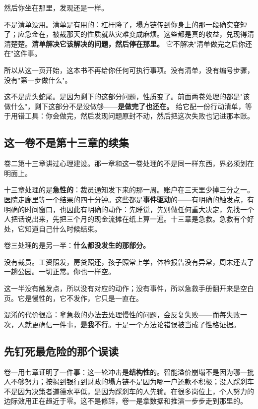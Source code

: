\documentclass[11pt,a4paper]{ctexart}
\begin{document}
然后你坐在那里，发现还是一样。

不是清单没用。清单是有用的：杠杆降了，塌方链传到你身上的那一段确实变短了；应急金在，被裁那天的性质就从灾难变成麻烦。这些都是真的收益，兑现得清清楚楚。\textbf{清单解决它该解决的问题，然后停在那里。} 它不解决"清单做完之后你还在"这件事。

所以从这一页开始，这本书不再给你任何可执行事项。没有清单，没有编号步骤，没有"第一步做什么"。

这不是虎头蛇尾。是因为剩下的这部分问题，性质变了。前面两卷处理的都是"该做什么"，剩下这部分不是没做够——\textbf{是做完了也还在。} 给它配一份行动清单，等于用错工具：你会做完，然后发现问题原封不动，然后把这次失败也记进那本账。

\subsection{这一卷不是第十三章的续集}

卷二第十三章讲过心理建设。那一章和这一卷处理的不是同一样东西，界必须划在明面上。

十三章处理的是\textbf{急性的}：裁员通知发下来的那一周。账户在三天里少掉三分之一。医院走廊里等一个结果的四十分钟。这些都是\textbf{事件驱动}的——有明确的触发点，有明确的时间窗口，也因此有明确的动作：先睡觉，先别做任何重大决定，先找一个人把话说出来，先把三个月的现金流摊在纸上算一遍。十三章是急救。急救有个好处，它知道自己什么时候结束。

卷三处理的是另一半：\textbf{什么都没发生的那部分。}

没有裁员。工资照发，房贷照还，孩子照常上学，体检报告没有异常，周末还去了一趟公园。一切正常。你也一样空。

这一半没有触发点，所以没有对应的动作；没有事件，所以急救手册翻开来是空白页。它是慢性的，它不发作，它只是一直在。

混淆的代价很高：拿急救的办法去处理慢性的问题，会反复失败——而每失败一次，人就更确信一件事，\textbf{是我不行}。于是一个方法论错误被当成了性格证据。

\subsection{先钉死最危险的那个误读}

卷一用七章证明了一件事：这一轮冲击是\textbf{结构性}的。智能溢价崩塌不是因为哪一批人不够努力；按揭到银行到财政的塌方链不是因为哪一户还款不积极；没人踩刹车不是因为决策者道德水平低，是因为踩刹车的人先输。在很多岗位上，个人努力的边际效用正在趋近于零。这不是修辞，卷一是拿数据和推演一步步走到那里的。
\end{document}
